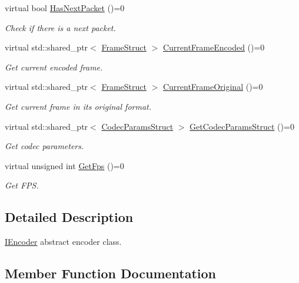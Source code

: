 \begin{DoxyCompactItemize}
virtual bool \hyperlink{classmoetsi_1_1ssp_1_1IEncoder_a2af8e23d841ef61f6ee4037e56a3694d}{Has\+Next\+Packet} ()=0
\begin{DoxyCompactList}\small\item\em Check if there is a next packet. \end{DoxyCompactList}\item 
virtual std\+::shared\+\_\+ptr$<$ \hyperlink{structmoetsi_1_1ssp_1_1FrameStruct}{Frame\+Struct} $>$ \hyperlink{classmoetsi_1_1ssp_1_1IEncoder_a178d117518e7c7007414ea9c82bd3ed6}{Current\+Frame\+Encoded} ()=0
\begin{DoxyCompactList}\small\item\em Get current encoded frame. \end{DoxyCompactList}\item 
virtual std\+::shared\+\_\+ptr$<$ \hyperlink{structmoetsi_1_1ssp_1_1FrameStruct}{Frame\+Struct} $>$ \hyperlink{classmoetsi_1_1ssp_1_1IEncoder_ab60bdaae0a85289dfa31a12bab533dc0}{Current\+Frame\+Original} ()=0
\begin{DoxyCompactList}\small\item\em Get current frame in its original format. \end{DoxyCompactList}\item 
virtual std\+::shared\+\_\+ptr$<$ \hyperlink{structmoetsi_1_1ssp_1_1CodecParamsStruct}{Codec\+Params\+Struct} $>$ \hyperlink{classmoetsi_1_1ssp_1_1IEncoder_ad5179efaa4c74207766dd64f46f4059a}{Get\+Codec\+Params\+Struct} ()=0
\begin{DoxyCompactList}\small\item\em Get codec parameters. \end{DoxyCompactList}\item 
virtual unsigned int \hyperlink{classmoetsi_1_1ssp_1_1IEncoder_ae6a865aa52230d81aed1cb5232402f6c}{Get\+Fps} ()=0
\begin{DoxyCompactList}\small\item\em Get F\+PS. \end{DoxyCompactList}\end{DoxyCompactItemize}


\subsection{Detailed Description}
\hyperlink{classmoetsi_1_1ssp_1_1IEncoder}{I\+Encoder} abstract encoder class. 

\subsection{Member Function Documentation}
\mbox{\label{classmoetsi_1_1ssp_1_1IEncoder_a8c223ec82fdd30ee8ee75157306054ec}} 
